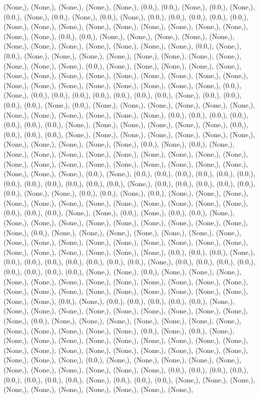\documentclass{article}
\begin{document}
(None,), (None,), (None,), (None,), (None,), (0.0,), (0.0,), (None,), (0.0,), (None,), (0.0,), (None,), (0.0,), (None,), (0.0,), (None,), (0.0,), (0.0,), (0.0,), (0.0,), (0.0,), (None,), (None,), (None,), (None,), (None,), (None,), (None,), (None,), (None,), (None,), (None,), (0.0,), (0.0,), (None,), (None,), (None,), (None,), (None,), (None,), (None,), (None,), (None,), (None,), (None,), (None,), (0.0,), (None,), (0.0,), (None,), (None,), (None,), (None,), (None,), (None,), (None,), (None,), (None,), (None,), (None,), (0.0,), (None,), (None,), (None,), (None,), (None,), (None,), (None,), (None,), (None,), (None,), (None,), (None,), (None,), (None,), (None,), (None,), (None,), (None,), (None,), (None,), (None,), (None,), (0.0,), (None,), (0.0,), (0.0,), (0.0,), (0.0,), (0.0,), (0.0,), (0.0,), (None,), (0.0,), (0.0,), (0.0,), (0.0,), (None,), (0.0,), (None,), (None,), (None,), (None,), (None,), (None,), (None,), (None,), (None,), (None,), (None,), (None,), (0.0,), (0.0,), (0.0,), (0.0,), (0.0,), (0.0,), (0.0,), (None,), (None,), (None,), (None,), (None,), (None,), (0.0,), (0.0,), (0.0,), (0.0,), (None,), (None,), (None,), (None,), (None,), (None,), (None,), (None,), (None,), (None,), (None,), (None,), (0.0,), (None,), (0.0,), (None,), (None,), (None,), (None,), (None,), (None,), (None,), (None,), (None,), (None,), (None,), (None,), (None,), (None,), (None,), (None,), (None,), (None,), (None,), (None,), (None,), (None,), (0.0,), (None,), (0.0,), (0.0,), (0.0,), (0.0,), (0.0,), (0.0,), (0.0,), (0.0,), (0.0,), (0.0,), (0.0,), (0.0,), (None,), (0.0,), (0.0,), (0.0,), (0.0,), (0.0,), (0.0,), (None,), (None,), (0.0,), (0.0,), (None,), (0.0,), (None,), (None,), (None,), (None,), (None,), (None,), (None,), (None,), (None,), (None,), (None,), (None,), (0.0,), (0.0,), (0.0,), (None,), (None,), (0.0,), (None,), (0.0,), (0.0,), (None,), (None,), (None,), (None,), (None,), (None,), (None,), (None,), (None,), (None,), (None,), (0.0,), (None,), (None,), (None,), (None,), (None,), (None,), (None,), (None,), (None,), (None,), (None,), (None,), (None,), (None,), (None,), (None,), (None,), (None,), (None,), (None,), (None,), (None,), (0.0,), (0.0,), (0.0,), (None,), (0.0,), (0.0,), (0.0,), (0.0,), (0.0,), (0.0,), (0.0,), (None,), (0.0,), (0.0,), (0.0,), (0.0,), (0.0,), (0.0,), (0.0,), (0.0,), (None,), (None,), (0.0,), (None,), (None,), (None,), (None,), (None,), (None,), (None,), (None,), (None,), (None,), (None,), (None,), (None,), (None,), (None,), (None,), (None,), (None,), (None,), (None,), (None,), (None,), (None,), (0.0,), (None,), (0.0,), (0.0,), (0.0,), (0.0,), (0.0,), (None,), (None,), (None,), (None,), (None,), (None,), (None,), (None,), (None,), (None,), (None,), (0.0,), (None,), (None,), (None,), (None,), (None,), (None,), (None,), (None,), (None,), (None,), (None,), (None,), (0.0,), (None,), (0.0,), (None,), (None,), (None,), (None,), (None,), (None,), (None,), (None,), (None,), (None,), (None,), (None,), (None,), (None,), (None,), (None,), (None,), (None,), (None,), (None,), (None,), (None,), (0.0,), (None,), (None,), (None,), (None,), (None,), (None,), (None,), (None,), (None,), (None,), (None,), (0.0,), (0.0,), (0.0,), (0.0,), (0.0,), (0.0,), (0.0,), (0.0,), (None,), (0.0,), (0.0,), (0.0,), (None,), (None,), (None,), (None,), (None,), (None,), (None,), (None,), (None,), (None,), 
\end{document}
